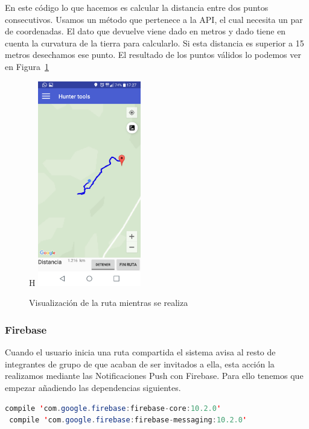 En este código lo que hacemos es calcular la distancia entre dos puntos consecutivos. Usamos un método que pertenece a la API,  el cual necesita un par de coordenadas. El dato que devuelve viene dado en metros y  dado tiene en cuenta la curvatura de la tierra para calcularlo. Si esta distancia es superior a 15 metros desechamos ese punto. El resultado de los puntos válidos lo podemos ver en  Figura~\ref{fig:individual-navegacion}

\begin{figure}{H}
		\centering
		\includegraphics[width=0.4\textwidth] {capturamovil/individual-navegacion.png}
		\caption{Visualización de la ruta mientras se realiza}
		\label{fig:individual-navegacion}
	\end{figure}
	
\subsubsection{Firebase} 
Cuando el usuario inicia una ruta compartida el sistema avisa al resto de integrantes de grupo de que acaban de ser invitados a ella, esta acción la realizamos mediante las Notificaciones Push con Firebase. Para ello tenemos que empezar añadiendo las dependencias siguientes.

	\begin{lstlisting}[language=java,caption={Dependencia de Firebase},label=DescriptiveLabel]
 compile 'com.google.firebase:firebase-core:10.2.0'
 compile 'com.google.firebase:firebase-messaging:10.2.0'

\end{lstlisting}
	
